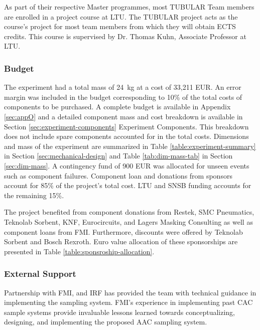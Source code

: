 As part of their respective Master programmes, most TUBULAR Team members are enrolled in a project course at LTU. The TUBULAR project acts as the course's project for most team members from which they will obtain ECTS credits. This course is supervised by Dr. Thomas Kuhn, Associate Professor at LTU.

\pagebreak
\subsubsection{Budget}
\label{sec:3.2.2}
The experiment had a total mass of \SI{24}{\kilo\gram} at a cost of 33,211 EUR. An error margin was included in the budget corresponding to 10\% of the total costs of components to be purchased. A complete budget is available in Appendix \ref{sec:appO} and a detailed component mass and cost breakdown is available in Section \ref{sec:experiment-components} Experiment Components. This breakdown does not include spare components accounted for in the total costs. Dimensions and mass of the experiment are summarized in Table \ref{table:experiment-summary} in Section \ref{sec:mechanical-design} and Table \ref{tab:dim-mass-tab} in Section \ref{sec:dim-mass}. A contingency fund of 900 EUR was allocated for unseen events such as component failures. Component loan and donations from sponsors account for 85\% of the project's total cost. LTU and SNSB funding accounts for the remaining 15\%. 

%

The project benefited from component donations from Restek, SMC Pneumatics, Teknolab Sorbent, KNF, Eurocircuits, and Lagers Masking Consulting as well as component loans from FMI. Furthermore, discounts were offered by Teknolab Sorbent and Bosch Rexroth. Euro value allocation of these sponsorships are presented in Table \ref{table:sponsroship-allocation}.




\subsubsection{External Support}

Partnership with FMI, and IRF has provided the team with technical guidance in implementing the sampling system. FMI’s experience in implementing past CAC sample systems provide invaluable lessons learned towards conceptualizing, designing, and implementing the proposed AAC sampling system.


